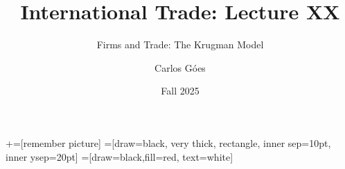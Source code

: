 \documentclass[notes,11pt, aspectratio=169, xcolor=table]{beamer}
\title[]{International Trade: Lecture XX}
\subtitle[]{Firms and Trade: The Krugman Model}
\author[Góes]
{Carlos Góes\inst{1}}
\date{Fall 2025}
\institute[GWU]{\inst{1} George Washington University }
\begin{document}
\newcommand\marktopleft[1]{%
    \tikz[overlay,remember picture] 
        \node (marker-#1-a) at (-.3em,.3em) {};%
}
\newcommand\markbottomright[2]{%
    \tikz[overlay,remember picture] 
        \node (marker-#1-b) at (0em,0em) {};%
}
+=[remember picture] 
 =[draw=black, very thick, rectangle, inner sep=10pt, inner ysep=20pt]
 =[draw=black,fill=red, text=white]















\frame{\titlepage}
\addtocounter{framenumber}{-1}
\end{document}
